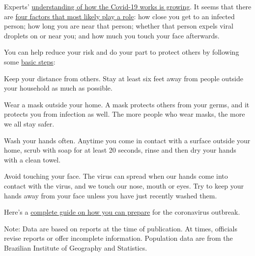 Experts'
\href{https://www.nytimes.com/2020/06/02/health/coronavirus-profile-covid.html}{understanding
of how the Covid-19 works is growing}. It seems that there are
\href{https://www.nytimes.com/article/coronavirus-how-it-spreads.html}{four
factors that most likely play a role}: how close you get to an infected
person; how long you are near that person; whether that person expels
viral droplets on or near you; and how much you touch your face
afterwards.

You can help reduce your risk and do your part to protect others by
following some
\href{https://www.nytimes.com/article/prepare-for-coronavirus.html}{basic
steps}:

Keep your distance from others. Stay at least six feet away from people
outside your household as much as possible.

Wear a mask outside your home. A mask protects others from your germs,
and it protects you from infection as well. The more people who wear
masks, the more we all stay safer.

Wash your hands often. Anytime you come in contact with a surface
outside your home, scrub with soap for at least 20 seconds, rinse and
then dry your hands with a clean towel.

Avoid touching your face. The virus can spread when our hands come into
contact with the virus, and we touch our nose, mouth or eyes. Try to
keep your hands away from your face unless you have just recently washed
them.

Here's a
\href{https://www.nytimes.com/interactive/2020/world/coronavirus-tips-advice.html}{complete
guide on how you can prepare} for the coronavirus outbreak.

Note: Data are based on reports at the time of publication. At times,
officials revise reports or offer incomplete information. Population
data are from the Brazilian Institute of Geography and Statistics.

